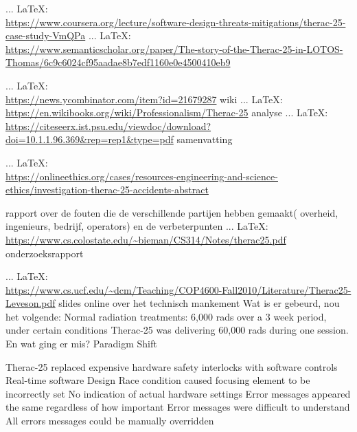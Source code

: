 \begin{thebibliography}{99}
{{{{				 ... \LaTeX:\\ \url{https://www.coursera.org/lecture/software-design-threats-mitigations/therac-25-case-study-VmQPa}
				 ... \LaTeX:\\ \url{https://www.semanticscholar.org/paper/The-story-of-the-Therac-25-in-LOTOS-Thomas/6c9c6024cf95aadae8b7edf1160e0e4500410eb9}
				
				 ... \LaTeX:\\ \url{https://news.ycombinator.com/item?id=21679287}
				wiki
				 ... \LaTeX:\\ \url{https://en.wikibooks.org/wiki/Professionalism/Therac-25}
				analyse
				 ... \LaTeX:\\ \url{https://citeseerx.ist.psu.edu/viewdoc/download?doi=10.1.1.96.369&rep=rep1&type=pdf}
				samenvatting
				
				 ... \LaTeX:\\ \url{https://onlineethics.org/cases/resources-engineering-and-science-ethics/investigation-therac-25-accidents-abstract}
				
				rapport over de fouten die de verschillende partijen hebben gemaakt( overheid, ingenieurs, bedrijf, operators) en de verbeterpunten
				 ... \LaTeX:\\ \url{https://www.cs.colostate.edu/~bieman/CS314/Notes/therac25.pdf}
				\cite{}
				onderzoeksrapport
				
				 ... \LaTeX:\\ \url{https://www.cs.ucf.edu/~dcm/Teaching/COP4600-Fall2010/Literature/Therac25-Leveson.pdf}
				\cite{}
				slides online over het technisch mankement
				Wat is er gebeurd, nou het volgende:
				Normal radiation treatments: 6,000 rads over a 3 week period, under certain conditions Therac-25 was delivering 60,000 rads during one session.
				En wat ging er mis?
				Paradigm Shift
				
				Therac-25 replaced expensive hardware safety interlocks with software controls
				Real-time software
				Design
				Race condition caused focusing element to be incorrectly set
				No indication of actual hardware settings
				Error messages appeared the same regardless of how important
				Error messages were difficult to understand
				All errors messages could be manually overridden
				
}}}}
\end{thebibliography}
